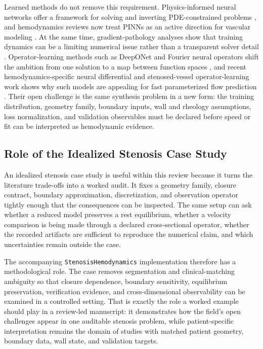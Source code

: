 Learned methods do not remove this requirement. Physics-informed neural networks
offer a framework for solving and inverting PDE-constrained problems
\cite{RaissiEtAl2019PhysicsInformedNeuralNetworks}, and hemodynamics reviews
now treat PINNs as an active direction for vascular modeling
\cite{YuEtAl2026PINNHemodynamicsReview}. At the same time, gradient-pathology
analyses show that training dynamics can be a limiting numerical issue rather
than a transparent solver detail
\cite{WangEtAl2021PINNGradientPathologies}. Operator-learning methods such as
DeepONet and Fourier neural operators shift the ambition from one solution to a
map between function spaces \cite{LuEtAl2021DeepONet,LiEtAl2021FNO}, and recent
hemodynamics-specific neural differential and stenosed-vessel operator-learning
work shows why such models are appealing for fast parameterized flow prediction
\cite{CsalaEtAl2025PCNDE,VelikorodnyEtAl2025DeepOperatorStenosed}. Their open
challenge is the same synthesis problem in a new form: the training
distribution, geometry family, boundary inputs, wall and rheology assumptions,
loss normalization, and validation observables must be declared before speed or
fit can be interpreted as hemodynamic evidence.

\subsection{Role of the Idealized Stenosis Case Study}
\label{subsec:synthesis-idealized-stenosis-case-study}

An idealized stenosis case study is useful within this review because it turns
the literature trade-offs into a worked audit. It fixes a geometry family,
closure contract, boundary approximation, discretization, and observation
operator tightly enough that the consequences can be inspected. The same setup
can ask whether a reduced model preserves a rest equilibrium, whether a velocity
comparison is being made through a declared cross-sectional operator, whether
the recorded artifacts are sufficient to reproduce the numerical claim, and
which uncertainties remain outside the case.

The accompanying \texttt{StenosisHemodynamics} implementation therefore has a
methodological role. The case removes segmentation and clinical-matching
ambiguity so that closure dependence, boundary sensitivity, equilibrium
preservation, verification evidence, and cross-dimensional observability can be
examined in a controlled setting. That is exactly the role a worked example
should play in a review-led manuscript: it demonstrates how the field's open
challenges appear in one auditable stenosis problem, while patient-specific
interpretation remains the domain of studies with matched patient geometry,
boundary data, wall state, and validation targets.
